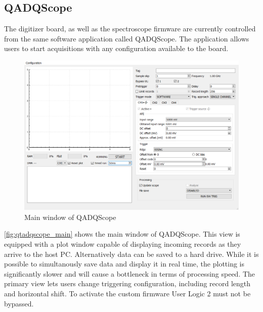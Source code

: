 \documentclass[a4paper,12pt,table]{article}
\begin{document}
	\subsection{QADQScope}
		The digitizer board, as well as the spectroscope firmware 
		are currently controlled from the same software application called QADQScope.
		The application allows users to start acquisitions with any 
		configuration available to the board. 
		\begin{figure}[!ht]
			\centering
			\includegraphics[width=\textwidth]{img/qtadqscope_main.png}
			\caption{Main window of QADQScope}\label{fig:qtadqscope_main}
		\end{figure}
		\autoref{fig:qtadqscope_main} shows the main window of QADQScope.
		This view is equipped with a plot window capable of displaying incoming
		records as they arrive to the host PC.
		Alternatively data can be saved to a hard drive. 
		While it is possible to simultanously save data and display it in real time,
		the plotting is significantly slower and will cause a bottleneck 
		in terms of processing speed.
		The primary view lets users change triggering configuration, 
		including record length and horizontal shift.
		To activate the custom firmware User Logic 2 must not be bypassed.
		\newpage
\end{document}
